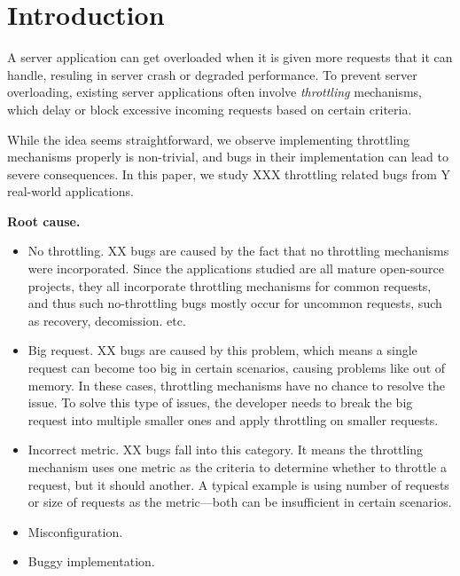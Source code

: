 \section{Introduction}

A server application can get overloaded when it is given more requests that it can handle,
resuling in server crash or degraded performance. To prevent server overloading, existing 
server applications often involve \emph{throttling} mechanisms, which delay or block
excessive incoming requests based on certain criteria.

While the idea seems straightforward, we observe implementing throttling mechanisms
properly is non-trivial, and bugs in their implementation can lead to severe consequences.
In this paper, we study XXX throttling related bugs from Y real-world applications.

\vspace{.05in}
\noindent
\textbf{Root cause.} 

\begin{itemize}

\item No throttling. XX bugs are caused by the fact that no throttling mechanisms
were incorporated. Since the applications studied are all mature open-source projects,
they all incorporate throttling mechanisms for common requests, and thus such no-throttling
bugs mostly occur for uncommon requests, such as recovery, decomission. etc.

\item Big request. XX bugs are caused by this problem, which means a single request can
become too big in certain scenarios, causing problems like out of memory. In these cases, throttling mechanisms
have no chance to resolve the issue. To solve this type of issues, the developer needs to
break the big request into multiple smaller ones and apply throttling on smaller requests.

\item Incorrect metric. XX bugs fall into this category. It means the throttling mechanism uses
one metric as the criteria to determine whether to throttle a request, but it should another. A
typical example is using number of requests or size of requests as the metric---both can be 
insufficient in certain scenarios.

\item Misconfiguration.

\item Buggy implementation.

\end{itemize}

